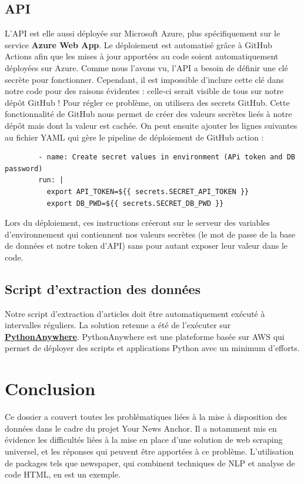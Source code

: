 \documentclass[french]{article}
\begin{document}
    \subsection{API}

    L'API est elle aussi déployée sur Microsoft Azure, plus spécifiquement sur le service \textbf{Azure Web App}. Le déploiement est automatisé grâce à GitHub Actions afin que les mises à jour apportées au code soient automatiquement déployées sur Azure.
    Comme nous l'avons vu, l'API a besoin de définir une clé secrète pour fonctionner. Cependant, il est impossible d'inclure cette clé dans notre code pour des raisons évidentes : celle-ci serait visible de tous sur notre dépôt GitHub ! Pour régler ce problème, on utilisera des secrets GitHub. Cette fonctionnalité de GitHub nous permet de créer des valeurs secrètes lieés à notre dépôt mais dont la valeur est cachée. On peut ensuite ajouter les lignes suivantes au fichier YAML qui gère le pipeline de déploiement de GitHub action : 
    \begin{verbatim}
        - name: Create secret values in environment (APi token and DB password)
        run: |
          export API_TOKEN=${{ secrets.SECRET_API_TOKEN }}
          export DB_PWD=${{ secrets.SECRET_DB_PWD }}
    \end{verbatim}

    Lors du déploiement, ces instructions créeront sur le serveur des variables d'environnement qui contiennent nos valeurs secrètes (le mot de passe de la base de données et notre token d'API) sans pour autant exposer leur valeur dans le code.

    \subsection{Script d'extraction des données}

    Notre script d'extraction d'articles doit être automatiquement exécuté à intervalles réguliers. La solution retenue a été de l'exécuter sur \textbf{\href{https://www.pythonanywhere.com/}{PythonAnywhere}}. PythonAnywhere est une plateforme basée sur AWS qui permet de déployer des scripts et applications Python avec un minimum d'efforts.

    \section*{Conclusion}

    Ce dossier a couvert toutes les problématiques liées à la mise à disposition des données dans le cadre du projet Your News Anchor. Il a notamment mis en évidence les difficultés liées à la mise en place d'une solution de web scraping universel, et les réponses qui peuvent être apportées à ce problème. L'utilisation de packages tels que newspaper, qui combinent techniques de NLP et analyse de code HTML, en est un exemple.
\end{document}
